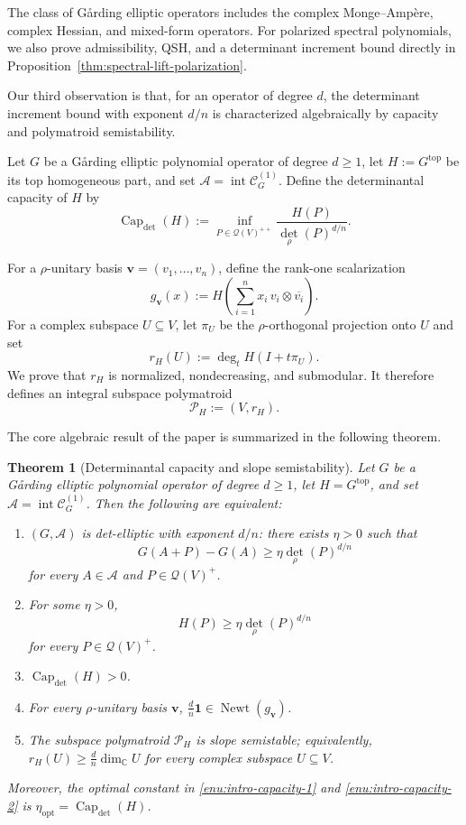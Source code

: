 \documentclass[oneside,english,letterpaper]{amsart}
\numberwithin{equation}{section}
\theoremstyle{plain}
\newtheorem{thm}{Theorem}[section]
\theoremstyle{definition}
\theoremstyle{remark}
\begin{document}
The class of G{\aa}rding elliptic operators includes the complex
Monge--Amp\`ere, complex Hessian, and mixed-form operators. For polarized spectral polynomials, we also
prove admissibility, QSH, and a determinant increment bound directly
in Proposition~\ref{thm:spectral-lift-polarization}.  

Our third observation is that, for an operator of degree $d$, the
determinant increment bound with exponent $d/n$ is characterized algebraically  by
capacity and polymatroid semistability.

Let $G$ be a G{\aa}rding elliptic polynomial operator of degree $d\geq1$,
let $
H:=G^{\mathrm{top}}$
be its top homogeneous part, and set {$\mathcal A=\operatorname{int}\mathcal C_G^{(1)}$}.
Define the determinantal capacity of $H$ by
\begin{equation}
\label{eq:intro-det-capacity}
\operatorname{Cap}_{\det}(H)
:=
\inf_{P\in\mathcal Q(V)^{++}}
\frac{H(P)}{\det_\rho(P)^{d/n}}.
\end{equation}

For a $\rho$-unitary basis
$\mathbf v=(v_1,\ldots,v_n)$, define the rank-one scalarization
\[
g_{\mathbf v}(x)
:=
H\left(
\sum_{i=1}^n x_i\,v_i\otimes\overline{v_i}
\right).
\]
For a complex subspace $U\subseteq V$, let $\pi_U$ be the
$\rho$-orthogonal projection onto $U$ and set
\[
r_H(U):=\deg_t H(I+t\pi_U).
\]
We prove that $r_H$ is normalized, nondecreasing, and submodular.
It therefore defines an integral subspace polymatroid
\[
\mathcal P_H:=(V,r_H).
\]

The core algebraic result of the paper is summarized in the following theorem.
\begin{thm}[Determinantal capacity and slope semistability]
\label{thm:intro-capacity-characterization}
Let $G$ be a G{\aa}rding elliptic polynomial operator of degree $d\geq1$,
let $H=G^{\mathrm{top}}$, and set $\mathcal A=\operatorname{int}\mathcal C_G^{(1)}$.
Then the following are equivalent:
\begin{enumerate}[label=\textup{(\arabic*)},nosep]
\item\label{enu:intro-capacity-1}
$(G,\mathcal A)$ is det-elliptic with exponent $d/n$: there exists
$\eta>0$ such that
\[
G(A+P)-G(A)\geq\eta\det_\rho(P)^{d/n}
\]
for every $A\in\mathcal A$ and $P\in\mathcal Q(V)^+$.
\item\label{enu:intro-capacity-2} For some $\eta>0$,
\[
H(P)\geq\eta\det_\rho(P)^{d/n}
\]
for every $P\in\mathcal Q(V)^+$.
\item\label{enu:intro-capacity-3} $\operatorname{Cap}_{\det}(H)>0$.
\item\label{enu:intro-capacity-4} For every $\rho$-unitary basis $\mathbf v$,
$\frac dn\mathbf 1\in\operatorname{Newt}(g_{\mathbf v})$.
\item\label{enu:intro-capacity-5} The subspace polymatroid $\mathcal P_H$ is slope semistable;
equivalently,
$r_H(U)\geq\frac dn\dim_{\mathbb C}U$
for every complex subspace $U\subseteq V$.
\end{enumerate}
Moreover, the optimal constant in \ref{enu:intro-capacity-1} and \ref{enu:intro-capacity-2} is
$\eta_{\mathrm{opt}}=\operatorname{Cap}_{\det}(H)$.
\end{thm}
\end{document}
